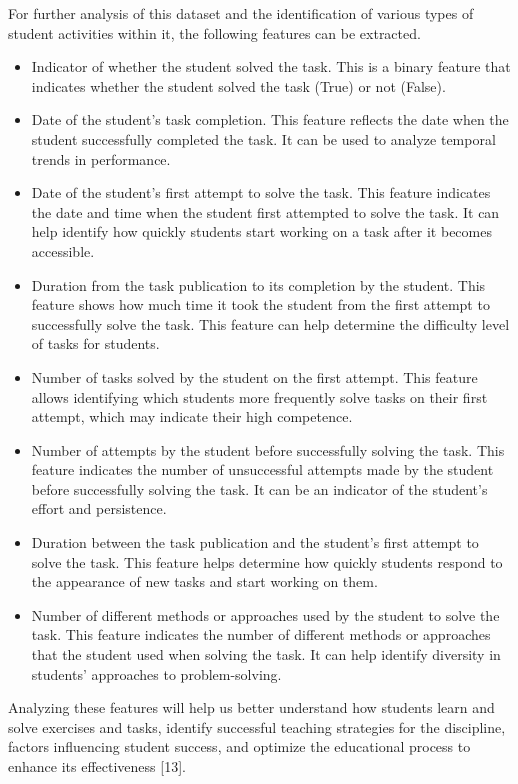 \documentclass{article}
\begin{document}
\begin{multicols}{2}
\begin{justify}
      For further analysis of this dataset and the identification of various types of student activities within it, the following features can be extracted.

      \begin{itemize}
        \item	Indicator of whether the student solved the task. This is a binary feature that indicates whether the student solved the task (True) or not (False).
        \item	Date of the student's task completion. This feature reflects the date when the student successfully completed the task. It can be used to analyze temporal trends in performance.
        \item	Date of the student's first attempt to solve the task. This feature indicates the date and time when the student first attempted to solve the task. It can help identify how quickly students start working on a task after it becomes accessible.
        \item	Duration from the task publication to its completion by the student. This feature shows how much time it took the student from the first attempt to successfully solve the task. This feature can help determine the difficulty level of tasks for students.
        \item	Number of tasks solved by the student on the first attempt. This feature allows identifying which students more frequently solve tasks on their first attempt, which may indicate their high competence.
        \item	Number of attempts by the student before successfully solving the task. This feature indicates the number of unsuccessful attempts made by the student before successfully solving the task. It can be an indicator of the student's effort and persistence.
        \item	Duration between the task publication and the student's first attempt to solve the task. This feature helps determine how quickly students respond to the appearance of new tasks and start working on them.
        \item	Number of different methods or approaches used by the student to solve the task. This feature indicates the number of different methods or approaches that the student used when solving the task. It can help identify diversity in students' approaches to problem-solving. 
      \end{itemize}

      Analyzing these features will help us better understand how students learn and solve exercises and tasks, identify successful teaching strategies for the discipline, factors influencing student success, and optimize the educational process to enhance its effectiveness [13].


\end{justify}
\end{multicols}
\end{document}
